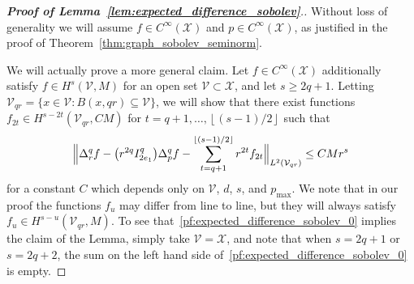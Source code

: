 \documentclass{article}
\newcommand{\floor}[1]{\left\lfloor #1 \right\rfloor}
\newcommand{\1}{\mathbf{1}}
\newcommand{\Xset}{\mathcal{X}}
\newcommand{\Vset}{\mathcal{V}}
\newcommand{\Leb}{L}
\theoremstyle{alden}
\theoremstyle{aldenthm}
\theoremstyle{definition}
\theoremstyle{remark}
\begin{document}
\begin{proof}[\textbf{Proof of Lemma~\ref{lem:expected_difference_sobolev}}.]
	Without loss of generality we will assume $f \in C^{\infty}(\Xset)$ and $p \in C^{\infty}(\Xset)$, as justified in the proof of Theorem~\ref{thm:graph_sobolev_seminorm}.
	
	We will actually prove a more general claim. Let $f \in C^{\infty}(\Xset)$ additionally satisfy $f \in H^s(\Vset,M)$ for an open set $\Vset \subset \Xset$, and let $s \geq 2q + 1$. Letting $\Vset_{qr} = \{x \in \Vset: B(x,qr) \subseteq \Vset\}$, we will show that there exist functions $f_{2t} \in H^{s - 2t}(\Vset_{qr},CM)$ for $t = q + 1,\ldots,\floor{(s - 1)/2}$ such that
	\begin{equation}
	\label{pf:expected_difference_sobolev_0}
	\Bigl\| \Delta_r^q f  - \bigl(r^{2q} I_{2e_1}^q\bigr) \Delta_p^q f - \sum_{t = q + 1}^{\floor{(s - 1)/2}} r^{2t}f_{2t} \Big\|_{\Leb^2(\Vset_{qr})} \leq C M r^s
	\end{equation}
	for a constant $C$ which depends only on $\Vset$, $d$, $s$, and $p_{\max}$.  We note that in our proof the functions $f_u$ may differ from line to line, but they will always satisfy $f_u \in H^{s - u}(\Vset_{qr},M)$. To see that~\eqref{pf:expected_difference_sobolev_0} implies the claim of the Lemma, simply take $\Vset = \Xset$, and note that when $s = 2q + 1$ or $s = 2q + 2$, the sum on the left hand side of~\eqref{pf:expected_difference_sobolev_0} is empty.
	

\end{proof}
\end{document}
